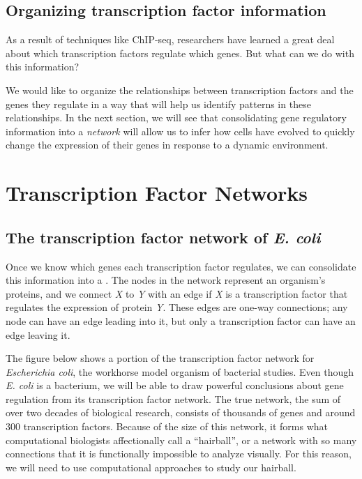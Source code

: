 \begin{qbox}\end{qbox} 


\FloatBarrier
{}
\subsection{Organizing transcription factor information}

As a result of techniques like ChIP-seq, researchers have learned a great deal about which transcription factors regulate which genes. But what can we do with this information?

We would like to organize the relationships between transcription factors and the genes they regulate in a way that will help us identify patterns in these relationships. In the next section, we will see that consolidating gene regulatory information into a \textit{network} will allow us to infer how cells have evolved to quickly change the expression of their genes in response to a dynamic environment.


\FloatBarrier
{}

\section{Transcription Factor Networks}
\label{sec:transcription_factor_networks}

\subsection{The transcription factor network of \textit{E. coli}}

Once we know which genes each transcription factor regulates, we can consolidate this information into a . The nodes in the network represent an organism's proteins, and we connect \textit{X} to \textit{Y} with an edge if \textit{X} is a transcription factor that regulates the expression of protein \textit{Y}. These edges are one-way connections; any node can have an edge leading into it, but only a transcription factor can have an edge leaving it.

The figure below shows a portion of the transcription factor network for \textit{Escherichia coli}, the workhorse model organism of bacterial studies. Even though \textit{E. coli} is a bacterium, we will be able to draw powerful conclusions about gene regulation from its transcription factor network. The true network, the sum of over two decades of biological research, consists of thousands of genes and around 300 transcription factors. Because of the size of this network, it forms what computational biologists affectionally call a ``hairball'', or a network with so many connections that it is functionally impossible to analyze visually. For this reason, we will need to use computational approaches to study our hairball.

